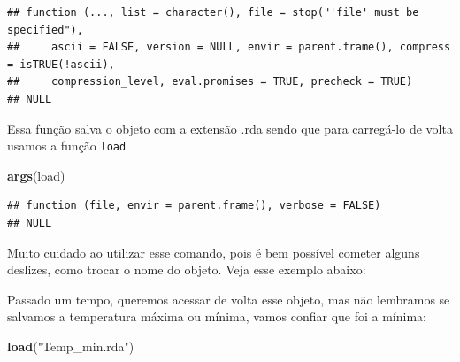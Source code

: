 \documentclass[]{book}
\newenvironment{Shaded}{\begin{snugshade}}{\end{snugshade}}
\newcommand{\KeywordTok}[1]{\textcolor[rgb]{0.13,0.29,0.53}{\textbf{#1}}}
\newcommand{\DataTypeTok}[1]{\textcolor[rgb]{0.13,0.29,0.53}{#1}}
\newcommand{\StringTok}[1]{\textcolor[rgb]{0.31,0.60,0.02}{#1}}
\newcommand{\CommentTok}[1]{\textcolor[rgb]{0.56,0.35,0.01}{\textit{#1}}}
\newcommand{\OperatorTok}[1]{\textcolor[rgb]{0.81,0.36,0.00}{\textbf{#1}}}
\newcommand{\NormalTok}[1]{#1}
\theoremstyle{definition}
\theoremstyle{definition}
\theoremstyle{definition}
\theoremstyle{remark}
\begin{document}
\begin{verbatim}
## function (..., list = character(), file = stop("'file' must be specified"), 
##     ascii = FALSE, version = NULL, envir = parent.frame(), compress = isTRUE(!ascii), 
##     compression_level, eval.promises = TRUE, precheck = TRUE) 
## NULL
\end{verbatim}

Essa função salva o objeto com a extensão .rda sendo que para carregá-lo
de volta usamos a função \texttt{load}

\begin{Shaded}
\begin{Highlighting}[]
\KeywordTok{args}\NormalTok{(load)}
\end{Highlighting}
\end{Shaded}

\begin{verbatim}
## function (file, envir = parent.frame(), verbose = FALSE) 
## NULL
\end{verbatim}

Muito cuidado ao utilizar esse comando, pois é bem possível cometer
alguns deslizes, como trocar o nome do objeto. Veja esse exemplo abaixo:

\begin{Shaded}
\end{Shaded}

Passado um tempo, queremos acessar de volta esse objeto, mas não
lembramos se salvamos a temperatura máxima ou mínima, vamos confiar que
foi a mínima:

\begin{Shaded}
\begin{Highlighting}[]
\KeywordTok{load}\NormalTok{(}\StringTok{"Temp_min.rda"}\NormalTok{)}
\end{Highlighting}
\end{Shaded}
\end{document}
